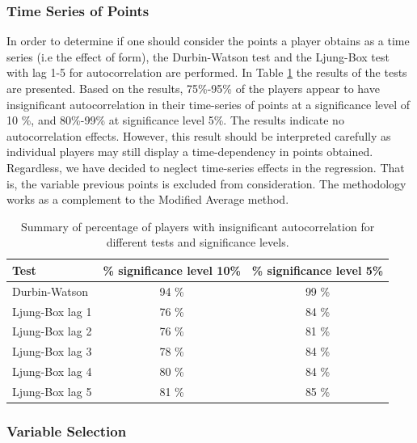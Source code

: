 \newpage


\subsubsection{Time Series of Points}

In order to determine if one should consider the points a player obtains as a time series (i.e the effect of form), the Durbin-Watson test and the Ljung-Box test with lag 1-5 for autocorrelation are performed. In Table \ref{tab:auto_tests} the results of the tests are presented. Based on the results, 75\%-95\% of the players appear to have insignificant autocorrelation in their time-series of points at a significance level of 10 \%, and 80\%-99\% at significance level 5\%. The results indicate no autocorrelation effects. However, this result should be interpreted carefully as individual players may still display a time-dependency in points obtained. Regardless, we have decided to neglect time-series effects in the regression. That is, the variable previous points is excluded from consideration. The methodology works as a complement to the Modified Average method.

\begin{table}[H]
\centering
\begin{tabular}{|l|c|c|}
\hline
Test            & \% significance level 10\% & \% significance level 5\% \\
\hline
Durbin-Watson   & 94 \% & 99 \%                                            \\
Ljung-Box lag 1 & 76 \% & 84 \%                                            \\
Ljung-Box lag 2 & 76 \% & 81 \%                                            \\
Ljung-Box lag 3 & 78 \% & 84 \%                                            \\
Ljung-Box lag 4 & 80 \% & 84 \%                                           \\
Ljung-Box lag 5 & 81 \% & 85 \%                
\\
\hline
\end{tabular}
\caption{Summary of percentage of players with insignificant autocorrelation for different tests and significance levels.}
\label{tab:auto_tests}
\end{table}

\subsubsection{Variable Selection}

